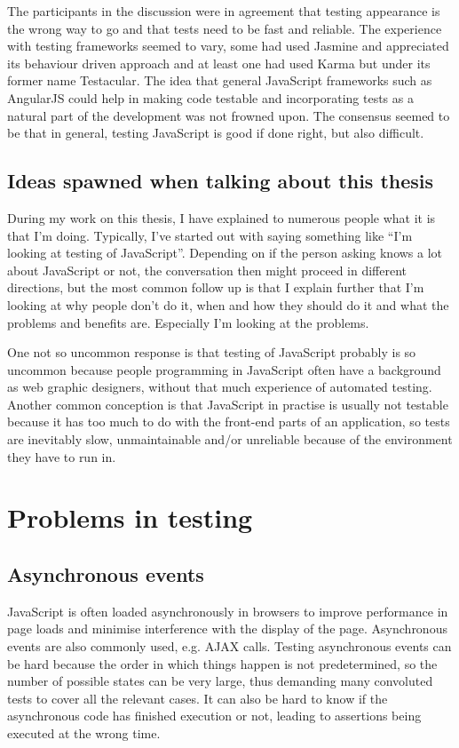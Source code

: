 \documentclass[11pt]{article}
\begin{document}
The participants in the discussion were in agreement that testing appearance is the wrong way to go and that tests need to be fast and reliable. The experience with testing frameworks seemed to vary, some had used Jasmine and appreciated its behaviour driven approach and at least one had used Karma but under its former name Testacular. The idea that general JavaScript frameworks such as AngularJS could help in making code testable and incorporating tests as a natural part of the development was not frowned upon. The consensus seemed to be that in general, testing JavaScript is good if done right, but also difficult.

\subsection{Ideas spawned when talking about this thesis}

During my work on this thesis, I have explained to numerous people what it is that I'm doing. Typically, I've started out with saying something like ``I'm looking at testing of JavaScript''. Depending on if the person asking knows a lot about JavaScript or not, the conversation then might proceed in different directions, but the most common follow up is that I explain further that I'm looking at why people don't do it, when and how they should do it and what the problems and benefits are. Especially I'm looking at the problems.

One not so uncommon response is that testing of JavaScript probably is so uncommon because people programming in JavaScript often have a background as web graphic designers, without that much experience of automated testing. Another common conception is that JavaScript in practise is usually not testable because it has too much to do with the front-end parts of an application, so tests are inevitably slow, unmaintainable and/or unreliable because of the environment they have to run in.


\section{Problems in testing}

\subsection{Asynchronous events}

JavaScript is often loaded asynchronously in browsers to improve performance in page loads and minimise interference with the display of the page. Asynchronous events are also commonly used, e.g. AJAX calls. Testing asynchronous events can be hard because the order in which things happen is not predetermined, so the number of possible states can be very large, thus demanding many convoluted tests to cover all the relevant cases. It can also be hard to know if the asynchronous code has finished execution or not, leading to assertions being executed at the wrong time.
\end{document}
